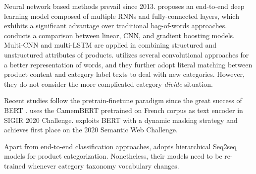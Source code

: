 Neural network based methods prevail since 2013. \cite{ha2016large} proposes an end-to-end deep learning model composed of multiple RNNs and fully-connected layers, which exhibits a significant advantage over traditional bag-of-words approaches. 
\cite{das2016large} conducts a comparison between linear, CNN, and gradient boosting models. 
Multi-CNN and multi-LSTM are applied in \cite{krishnan2019large} combining structured and unstructured attributes of products. 
\cite{chen2019fine} utilizes 
several convolutional approaches
for a better representation of words, and they further adopt literal matching between product content and category label texts to deal with new categories. However, they do not consider the more complicated category \textit{divide} situation. 

Recent studies follow the pretrain-finetune paradigm since the great success of BERT \cite{devlin-etal-2019-bert}. 
\cite{lee2020cbb} uses the CamemBERT pretrained on French corpus as text encoder in SIGIR 2020 
Challenge. \cite{yang2020bert} exploits BERT with a dynamic masking strategy and achieves first place on 
the 2020 Semantic Web Challenge.

Apart from end-to-end classification approaches, \cite{hasson2021category, li2018don} adopts  hierarchical 
Seq2seq
models for product categorization. Nonetheless, their models need to be re-trained whenever category taxonomy vocabulary changes.

